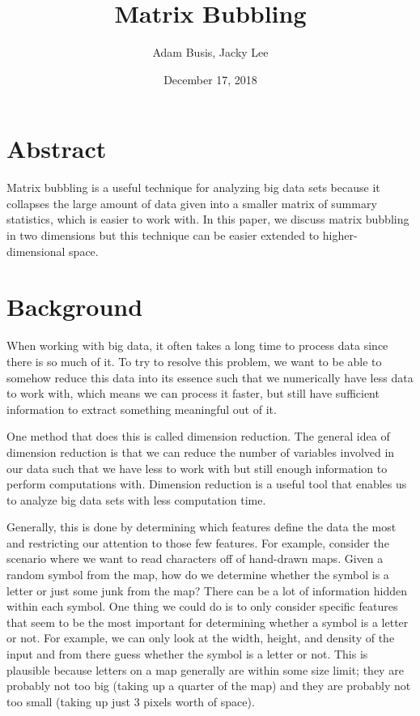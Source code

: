 \documentclass{article}
\title{Matrix Bubbling}
\author{Adam Busis, Jacky Lee}
\date{December 17, 2018}
\begin{document}
\nocite{*}

\maketitle

\section{Abstract}

Matrix bubbling is a useful technique for analyzing big data sets because it
collapses the large amount of data given into a smaller matrix of summary
statistics, which is easier to work with. In this paper, we discuss matrix
bubbling in two dimensions but this technique can be easier extended to
higher-dimensional space.

\section{Background}

When working with big data, it often takes a long time to process data since
there is so much of it. To try to resolve this problem, we want to be able to
somehow reduce this data into its essence such that we numerically have less
data to work with, which means we can process it faster, but still have
sufficient information to extract something meaningful out of it.

One method that does this is called dimension reduction. The general idea of
dimension reduction is that we can reduce the number of variables involved in
our data such that we have less to work with but still enough information to
perform computations with. Dimension reduction is a useful tool that enables us
to analyze big data sets with less computation time.

Generally, this is done by determining which features define the data the most
and restricting our attention to those few features. For example, consider the
scenario where we want to read characters off of hand-drawn maps. Given a
random symbol from the map, how do we determine whether the symbol is a letter
or just some junk from the map? There can be a lot of information hidden within
each symbol. One thing we could do is to only consider specific features that
seem to be the most important for determining whether a symbol is a letter or
not. For example, we can only look at the width, height, and density of the
input and from there guess whether the symbol is a letter or not. This is
plausible because letters on a map generally are within some size limit; they
are probably not too big (taking up a quarter of the map) and they are probably
not too small (taking up just 3 pixels worth of space).
\end{document}
